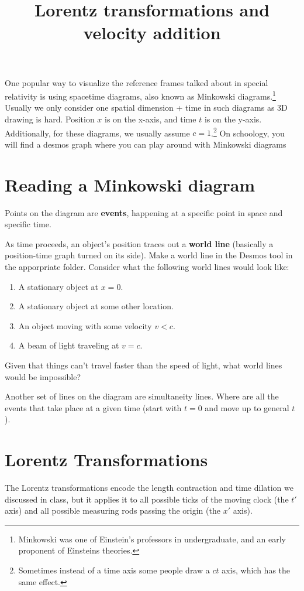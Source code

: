 \documentclass[phy1200]{handout}
\title{Lorentz transformations and velocity addition}
\begin{document}
\maketitle

One popular way to visualize the reference frames talked about in special relativity is using spacetime diagrams, also known as Minkowski diagrams.\footnote{Minkowski was one of Einstein's professors in undergraduate, and an early proponent of Einsteins theories.} Usually we only consider one spatial dimension + time in such diagrams as 3D drawing is hard. Position $x$ is on the x-axis, and time $t$ is on the y-axis. Additionally, for these diagrams, we usually assume $c=1$.\footnote{Sometimes instead of a time axis some people draw a $ct$ axis, which has the same effect.} On schoology, you will find a desmos graph where you can play around with Minkowski diagrams

\section{Reading a Minkowski diagram}
Points on the diagram are \textbf{events}, happening at a specific point in space and specific time.

As time proceeds, an object's position traces out a \textbf{world line} (basically a position-time graph turned on its side). Make a world line in the Desmos tool in the apporpriate folder. Consider what the following world lines would look like:
\begin{enumerate}
    \item A stationary object at $x=0$.
    \item A stationary object at some other location.
    \item An object moving with some velocity $v<c$.
    \item A beam of light traveling at $v=c$.
\end{enumerate}
Given that things can't travel faster than the speed of light, what world lines would be impossible?

Another set of lines on the diagram are simultaneity lines. Where are all the events that take place at a given time (start with $t=0$ and move up to general $t$).

\section{Lorentz Transformations}
The Lorentz transformations encode the length contraction and time dilation we discussed in class, but it applies it to all possible ticks of the moving clock (the $t'$ axis) and all possible measuring rods passing the origin (the $x'$ axis).
\end{document}
